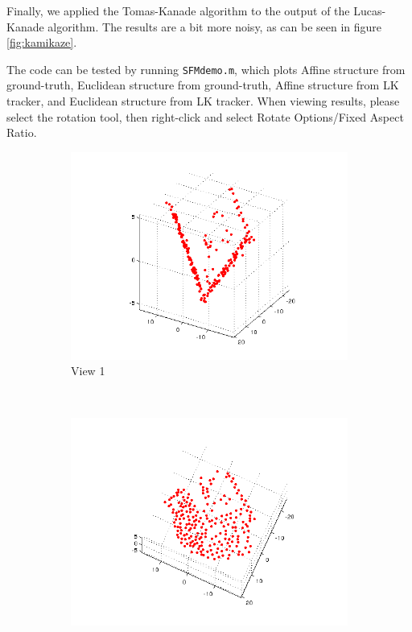\documentclass[a4paper,10pt]{article}
\begin{document}
Finally, we applied the Tomas-Kanade algorithm to the output of the Lucas-Kanade algorithm.
The results are a bit more noisy, as can be seen in figure \ref{fig:kamikaze}.

The code can be tested by running  \verb+SFMdemo.m+, which plots Affine structure from ground-truth, Euclidean structure from ground-truth, Affine structure from LK tracker, and Euclidean structure from LK tracker.
When viewing results, please select the rotation tool, then right-click and select Rotate Options/Fixed Aspect Ratio.

\begin{figure}[h!tb]

        \centering
        \begin{subfigure}{0.3\textwidth}
                \centering
                \includegraphics[width=\textwidth]{AffineStructure1}
                \caption{View 1}
        \end{subfigure}
        ~
        \begin{subfigure}{0.3\textwidth}
                \centering
                \includegraphics[width=\textwidth]{AffineStructure2}

\end{subfigure}
\end{figure}
\end{document}
